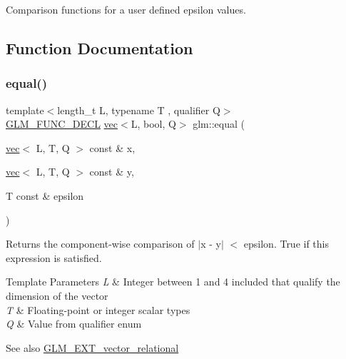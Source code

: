 Comparison functions for a user defined epsilon values. 

\subsection{Function Documentation}
\mbox{\label{group__ext__vector__relational_gae630b1f87fbd3b762ca46b0b8b32b02e}} 
\subsubsection{\texorpdfstring{equal()}{equal()}\hspace{0.1cm}{\footnotesize\ttfamily [1/3]}}
{\footnotesize\ttfamily template$<$length\+\_\+t L, typename T , qualifier Q$>$ \\
\hyperlink{setup_8hpp_ab2d052de21a70539923e9bcbf6e83a51}{G\+L\+M\+\_\+\+F\+U\+N\+C\+\_\+\+D\+E\+CL} \hyperlink{structglm_1_1vec}{vec}$<$L, bool, Q$>$ glm\+::equal (\begin{DoxyParamCaption}\item[{\hyperlink{structglm_1_1vec}{vec}$<$ L, T, Q $>$ const \&}]{x,  }\item[{\hyperlink{structglm_1_1vec}{vec}$<$ L, T, Q $>$ const \&}]{y,  }\item[{T const \&}]{epsilon }\end{DoxyParamCaption})}

Returns the component-\/wise comparison of $\vert$x -\/ y$\vert$ $<$ epsilon. True if this expression is satisfied.


\begin{DoxyTemplParams}{Template Parameters}
{\em L} & Integer between 1 and 4 included that qualify the dimension of the vector \\
\hline
{\em T} & Floating-\/point or integer scalar types \\
\hline
{\em Q} & Value from qualifier enum\\
\hline
\end{DoxyTemplParams}
\begin{DoxySeeAlso}{See also}
\hyperlink{group__ext__vector__relational}{G\+L\+M\+\_\+\+E\+X\+T\+\_\+vector\+\_\+relational} 
\end{DoxySeeAlso}
\mbox{\label{group__ext__vector__relational_ga6fb2432528edd028e3c2cf5b78d99797}} 
